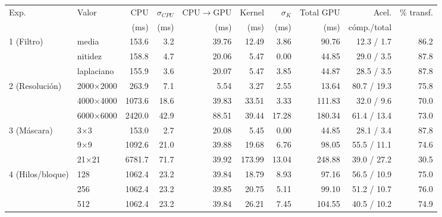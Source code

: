 \begin{tabular}{llrrrrrrrr}
\toprule
Exp. & Valor & CPU & $\sigma_{CPU}$ & CPU$\to$GPU & Kernel & $\sigma_{K}$ & Total GPU & Acel. & \% transf. \\
 & & (ms) & (ms) & (ms) & (ms) & (ms) & (ms) & cómp./total & \\
\midrule
1 (Filtro) & media & 153.6 & 3.2 & 39.76 & 12.49 & 3.86 & 90.76 & 12.3 / 1.7 & 86.2 \\
 & nitidez & 158.8 & 4.7 & 20.06 & 5.47 & 0.00 & 44.85 & 29.0 / 3.5 & 87.8 \\
 & laplaciano & 155.9 & 3.6 & 20.07 & 5.47 & 3.85 & 44.87 & 28.5 / 3.5 & 87.8 \\
\midrule
2 (Resolución) & 2000$\times$2000 & 263.9 & 7.1 & 5.54 & 3.27 & 2.55 & 13.64 & 80.7 / 19.3 & 75.8 \\
 & 4000$\times$4000 & 1073.6 & 18.6 & 39.83 & 33.51 & 3.33 & 111.83 & 32.0 / 9.6 & 70.0 \\
 & 6000$\times$6000 & 2420.0 & 42.9 & 88.51 & 39.44 & 17.28 & 180.34 & 61.4 / 13.4 & 73.0 \\
\midrule
3 (Máscara) & 3$\times$3 & 153.0 & 2.7 & 20.08 & 5.45 & 0.00 & 44.85 & 28.1 / 3.4 & 87.8 \\
 & 9$\times$9 & 1092.6 & 21.0 & 39.88 & 19.68 & 6.76 & 98.05 & 55.5 / 11.1 & 74.6 \\
 & 21$\times$21 & 6781.7 & 71.7 & 39.92 & 173.99 & 13.04 & 248.88 & 39.0 / 27.2 & 30.5 \\
\midrule
4 (Hilos/bloque) & 128 & 1062.4 & 23.2 & 39.84 & 18.79 & 8.93 & 97.16 & 56.5 / 10.9 & 75.0 \\
 & 256 & 1062.4 & 23.2 & 39.85 & 20.75 & 5.11 & 99.10 & 51.2 / 10.7 & 76.0 \\
 & 512 & 1062.4 & 23.2 & 39.84 & 26.21 & 7.45 & 104.55 & 40.5 / 10.2 & 74.9 \\
\bottomrule
\end{tabular}
